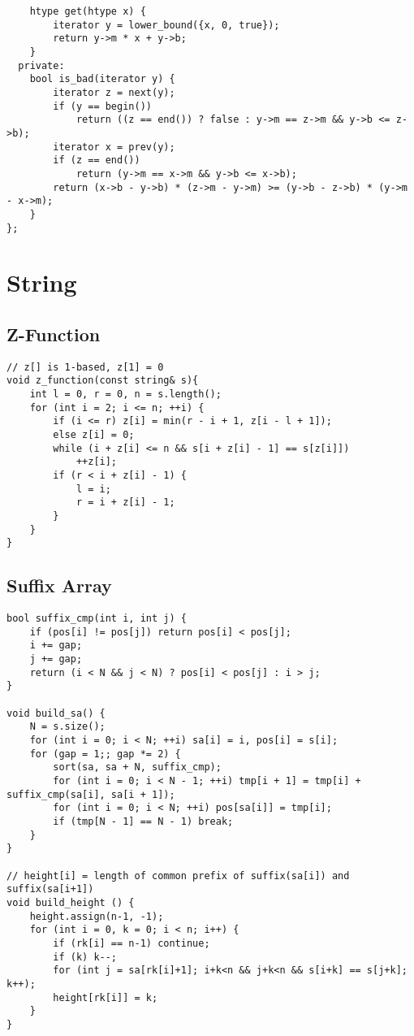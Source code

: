 \documentclass[10pt,landscape]{article}
\begin{document}
\begin{multicols}{2}
\begin{lstlisting}
    htype get(htype x) {
        iterator y = lower_bound({x, 0, true});
        return y->m * x + y->b;
    }
  private:
    bool is_bad(iterator y) {
        iterator z = next(y);
        if (y == begin())
            return ((z == end()) ? false : y->m == z->m && y->b <= z->b);
        iterator x = prev(y);
        if (z == end())
            return (y->m == x->m && y->b <= x->b);
        return (x->b - y->b) * (z->m - y->m) >= (y->b - z->b) * (y->m - x->m);
    }
};
\end{lstlisting}
\section{String}
\subsection{Z-Function}
\begin{lstlisting}
// z[] is 1-based, z[1] = 0
void z_function(const string& s){
    int l = 0, r = 0, n = s.length();
    for (int i = 2; i <= n; ++i) {
        if (i <= r) z[i] = min(r - i + 1, z[i - l + 1]);
        else z[i] = 0;
        while (i + z[i] <= n && s[i + z[i] - 1] == s[z[i]])
            ++z[i];
        if (r < i + z[i] - 1) {
            l = i;
            r = i + z[i] - 1;
        }
    }
}
\end{lstlisting}
\subsection{Suffix Array}
\begin{lstlisting}
bool suffix_cmp(int i, int j) {
    if (pos[i] != pos[j]) return pos[i] < pos[j];
    i += gap;
    j += gap;
    return (i < N && j < N) ? pos[i] < pos[j] : i > j;
}

void build_sa() {
    N = s.size();
    for (int i = 0; i < N; ++i) sa[i] = i, pos[i] = s[i];
    for (gap = 1;; gap *= 2) {
        sort(sa, sa + N, suffix_cmp);
        for (int i = 0; i < N - 1; ++i) tmp[i + 1] = tmp[i] + suffix_cmp(sa[i], sa[i + 1]);
        for (int i = 0; i < N; ++i) pos[sa[i]] = tmp[i];
        if (tmp[N - 1] == N - 1) break;
    }
}

// height[i] = length of common prefix of suffix(sa[i]) and suffix(sa[i+1])
void build_height () {
    height.assign(n-1, -1);
    for (int i = 0, k = 0; i < n; i++) {
        if (rk[i] == n-1) continue;
        if (k) k--;
        for (int j = sa[rk[i]+1]; i+k<n && j+k<n && s[i+k] == s[j+k]; k++);
        height[rk[i]] = k;
    }
}
\end{lstlisting}

\end{multicols}
\end{document}
